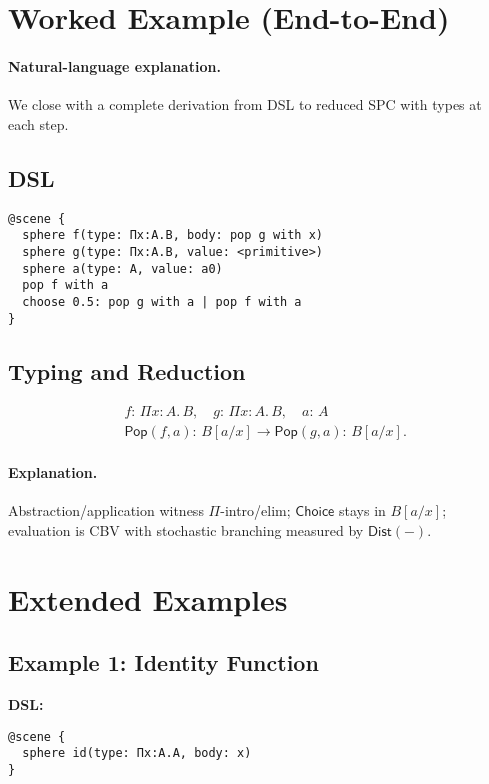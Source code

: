 \documentclass[12pt]{article}
\newcommand{\Types}{:\,}
\newcommand{\Subst}[2]{[#1/#2]}
\newcommand{\Pop}{\mathsf{Pop}}
\newcommand{\Choice}{\mathsf{Choice}}
\newcommand{\PiT}[3]{\Pi #1 : #2.\, #3}
\newcommand{\Dist}[1]{\mathsf{Dist}(#1)}
\newcommand{\step}{\rightarrow}
\theoremstyle{definition}
\begin{document}
\section{Worked Example (End-to-End)}
\paragraph{Natural-language explanation.}
We close with a complete derivation from DSL to reduced SPC with types at each step.

\subsection*{DSL}
\begin{verbatim}
@scene {
  sphere f(type: Πx:A.B, body: pop g with x)
  sphere g(type: Πx:A.B, value: <primitive>)
  sphere a(type: A, value: a0)
  pop f with a
  choose 0.5: pop g with a | pop f with a
}
\end{verbatim}

\subsection*{Typing and Reduction}
\begin{align*}
& f \Types \PiT{x}{A}{B},\quad g \Types \PiT{x}{A}{B},\quad a \Types A \\
& \Pop(f,a) \Types B\Subst{a}{x} \step \Pop(g,a) \Types B\Subst{a}{x}.
\end{align*}

\paragraph{Explanation.}
Abstraction/application witness $\Pi$-intro/elim; $\Choice$ stays in $B[a/x]$; evaluation is CBV with stochastic branching measured by $\Dist{-}$.

\section{Extended Examples}
\subsection{Example 1: Identity Function}
\textbf{DSL:}
\begin{verbatim}
@scene {
  sphere id(type: Πx:A.A, body: x)
}
\end{verbatim}
\end{document}
